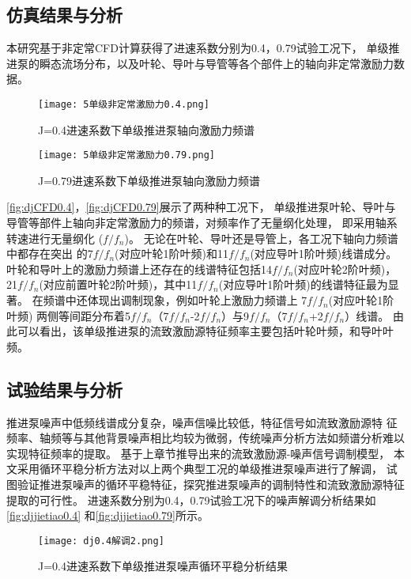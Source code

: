 \subsection{仿真结果与分析}
本研究基于非定常CFD计算获得了进速系数分别为0.4，0.79试验工况下，
单级推进泵的瞬态流场分布，以及叶轮、导叶与导管等各个部件上的轴向非定常激励力数据。
\begin{figure}[htbp]
    \centering
    \texttt{[image: 5单级非定常激励力0.4.png]}
    \caption{\label{fig:djCFD0.4}J=0.4进速系数下单级推进泵轴向激励力频谱}
\end{figure}
\begin{figure}[htbp]
    \centering
    \texttt{[image: 5单级非定常激励力0.79.png]}
    \caption{\label{fig:djCFD0.79}J=0.79进速系数下单级推进泵轴向激励力频谱}
\end{figure}
\autoref{fig:djCFD0.4}，\autoref{fig:djCFD0.79}展示了两种种工况下，
单级推进泵叶轮、导叶与导管等部件上轴向非定常激励力的频谱，对频率作了无量纲化处理，
即采用轴系转速进行无量纲化 ($f/f_n$)。
无论在叶轮、导叶还是导管上，各工况下轴向力频谱中都存在突出
的7$f/f_n$(对应叶轮1阶叶频)和11$f/f_n$(对应导叶1阶叶频)线谱成分。
叶轮和导叶上的激励力频谱上还存在的线谱特征包括14$f/f_n$(对应叶轮2阶叶频)，
21$f/f_n$(对应前置叶轮2阶叶频)，其中11$f/f_n$(对应导叶1阶叶频)的线谱特征最为显著。
在频谱中还体现出调制现象，例如叶轮上激励力频谱上
7$f/f_n$(对应叶轮1阶叶频)
两侧等间距分布着5$f/f_n$（7$f/f_n$-2$f/f_n$）与9$f/f_n$（7$f/f_n$+2$f/f_n$）线谱。
由此可以看出，该单级推进泵的流致激励源特征频率主要包括叶轮叶频，和导叶叶频。
\subsection{试验结果与分析}
推进泵噪声中低频线谱成分复杂，噪声信噪比较低，特征信号如流致激励源特
征频率、轴频等与其他背景噪声相比均较为微弱，传统噪声分析方法如频谱分析难以实现特征频率的提取。
基于上章节推导出来的流致激励源-噪声信号调制模型，
本文采用循环平稳分析方法对以上两个典型工况的单级推进泵噪声进行了解调，
试图验证推进泵噪声的循环平稳特征，探究推进泵噪声的调制特性和流致激励源特征提取的可行性。
进速系数分别为0.4，0.79试验工况下的噪声解调分析结果如\autoref{fig:djjietiao0.4}
和\autoref{fig:djjietiao0.79}所示。
\begin{figure}[htbp]
    \centering
    \texttt{[image: dj0.4解调2.png]}
    \caption{\label{fig:djjietiao0.4}J=0.4进速系数下单级推进泵噪声循环平稳分析结果}
\end{figure}


